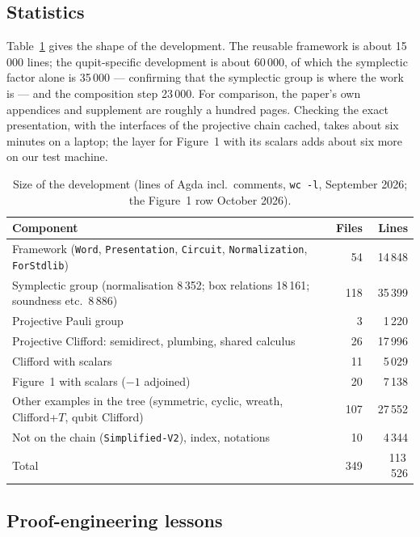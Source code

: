 \subsection{Statistics}

Table~\ref{tab:stats} gives the shape of the development.  The reusable
framework is about 15\,000 lines; the qupit-specific development is
about 60\,000, of which the symplectic factor alone is 35\,000 ---
confirming that the symplectic group is where the work is --- and the
composition step 23\,000.  For comparison, the paper's own appendices
and supplement are roughly a hundred pages.  Checking the exact
presentation, with the interfaces of the projective chain cached, takes
about six minutes on a laptop; the layer for Figure~1 with its scalars
adds about six more on our test machine.

\begin{table}[h]
\caption{Size of the development (lines of Agda incl.\ comments,
\texttt{wc -l}, September 2026; the Figure~1 row October 2026).}
\label{tab:stats}
\centering\small
\begin{tabular}{@{}lrr@{}}
\toprule
Component & Files & Lines \\
\midrule
Framework (\texttt{Word}, \texttt{Presentation}, \texttt{Circuit}, \texttt{Normalization}, \texttt{ForStdlib}) & 54 & 14\,848 \\
Symplectic group (normalisation 8\,352; box relations 18\,161; soundness etc.\ 8\,886) & 118 & 35\,399 \\
Projective Pauli group & 3 & 1\,220 \\
Projective Clifford: semidirect, plumbing, shared calculus & 26 & 17\,996 \\
Clifford with scalars & 11 & 5\,029 \\
Figure~1 with scalars ($-1$ adjoined) & 20 & 7\,138 \\
\midrule
Other examples in the tree (symmetric, cyclic, wreath, Clifford+$T$, qubit Clifford) & 107 & 27\,552 \\
Not on the chain (\texttt{Simplified-V2}), index, notations & 10 & 4\,344 \\
\midrule
Total & 349 & 113\,526 \\
\bottomrule
\end{tabular}
\end{table}

\subsection{Proof-engineering lessons}

